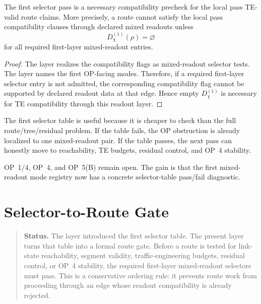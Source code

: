 \begin{theorem}
\label{thm:v410r21-first-selector-pass-compatibility-precheck}
The first selector pass is a necessary compatibility precheck for the local pass
TE-valid route claims. More precisely, a route cannot satisfy the local pass
compatibility clauses through declared mixed readouts unless
\[
 D_{\chi}^{(1)}(\rho)=\varnothing
\]
for all required first-layer mixed-readout entries.
\end{theorem}

\begin{proof}
The layer realizes the compatibility flags as mixed-readout selector
tests. The layer names the first OP-facing modes. Therefore, if a required
first-layer selector entry is not admitted, the corresponding compatibility flag
cannot be supported by declared readout data at that edge. Hence empty
\(D_{\chi}^{(1)}\) is necessary for TE compatibility through this readout
layer.
\end{proof}

\begin{remark}
\label{rem:v410r21-where-this-helps-ops}
The first selector table is useful because it is cheaper to check than the full
route/tree/residual problem. If the table fails, the OP obstruction is already
localized to one mixed-readout pair. If the table passes, the next pass can
honestly move to reachability, TE budgets, residual control, and OP~4 stability.
\end{remark}

\begin{remark}
\label{rem:v410r21-op-status}
OP~1/4, OP~4, and OP~5(B) remain open. The gain is that the first mixed-readout
mode registry now has a concrete selector-table pass/fail diagnostic.
\end{remark}



\clearpage
\section{Selector-to-Route Gate}
\label{sec:v410r22-selector-to-route-gate}

\begin{quote}\small
\noindent\textbf{Status.}
The layer introduced the first selector table. The present layer turns
that table into a formal route gate. Before a route is tested for link-state
reachability, segment validity, traffic-engineering budgets, residual control,
or OP~4 stability, the required first-layer mixed-readout selectors must pass.
This is a conservative ordering rule: it prevents route work from proceeding
through an edge whose readout compatibility is already rejected.
\end{quote}

